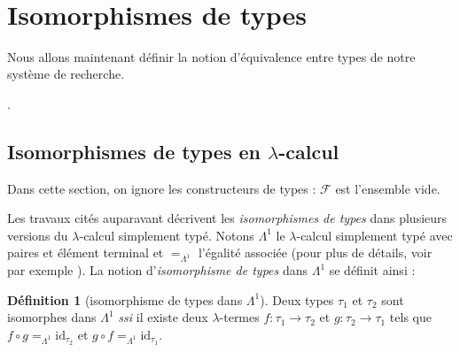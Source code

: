 \documentclass[a4paper]{report}
\theoremstyle{definition}
\newtheorem{definition}[theoreme]{Définition}
\newcommand{\ssi}{\textit{ssi}\xspace}
\newcommand{\F}{\mathscr{F}}
\newcommand\laure[1]{{\bf\color{WildStrawberry}{TODO: #1}}\\}
\begin{document}
\laure{parler de unif versus matching ici}

\section{Isomorphismes de types}


Nous allons maintenant définir la notion d'équivalence entre types de notre système de recherche.

.
\laure{bof, la liste des gens, surtout que tu les cite après}

\subsection{Isomorphismes de types en $\lambda$-calcul}

Dans cette section, on ignore les constructeurs de types : $\F$ est l'ensemble vide.

Les travaux cités auparavant décrivent les \emph{isomorphismes de types} dans plusieurs versions du $\lambda$-calcul simplement typé. Notons $\Lambda^1$ le $\lambda$-calcul simplement typé avec paires et élément terminal et $=_{\Lambda^1}$ l'égalité associée (pour plus de détails, voir par exemple \cite{DiCosmo95}). La notion d'\emph{isomorphisme de types} dans $\Lambda^1$ se définit ainsi :

\begin{definition}[isomorphisme de types dans $\Lambda^1$]
  Deux types $\tau_1$ et $\tau_2$ sont isomorphes dans $\Lambda^1$ \ssi il existe deux $\lambda$-termes $f : \tau_1 \rightarrow \tau_2$ et $g : \tau_2 \rightarrow \tau_1$ tels que $f \circ g =_{\Lambda^1} \mathrm{id}_{\tau_2}$ et $g \circ f =_{\Lambda^1} \mathrm{id}_{\tau_1}$.
\end{definition}
\end{document}
